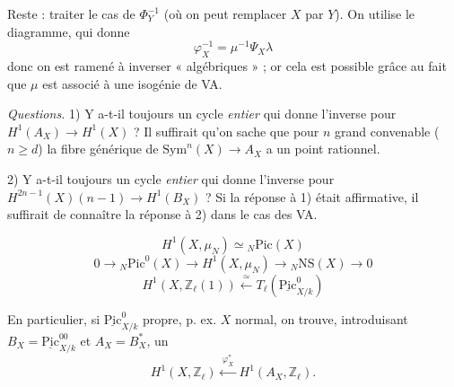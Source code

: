 \documentclass[11pt,a4paper]{article}
\begin{document}
Reste : traiter le cas de $\Phi_{Y}^{-1}$ (où on peut remplacer $X$ par $Y$). On utilise le
 diagramme, qui donne
\[
  \varphi_{X}^{-1} = \mu^{-1}\Psi_{X}\lambda
\]
donc on est ramené à inverser  « algébriques » ; or cela est possible grâce au fait
que $\mu$ est associé à une isogénie de VA.

\emph{Questions.} 1) Y a-t-il toujours un cycle \emph{entier} qui donne l'inverse pour
$H^{1}(A_{X}) \to H^{1}(X)$ ? Il suffirait qu'on sache que pour $n$ grand convenable
( $n \geqslant d$) la fibre générique de $\mathrm{Sym}^{n}(X) \to A_{X}$ a un point
rationnel.

2) Y a-t-il toujours un cycle \emph{entier} qui donne l'inverse pour
$H^{2n-1}(X)(n-1) \to H^{1}(B_{X})$ ? Si la réponse à 1) était affirmative, il suffirait de
connaître la réponse à 2) dans le cas des VA.

\[
  H^{1}(X, \mu_{N}) \simeq {}_{N}\mathrm{Pic}(X)
\]
\[
  0 \to {}_{N}\mathrm{Pic}^{0}(X) \to H^{1}(X, \mu_{N}) \longrightarrow {}_{N}\mathrm{NS}(X) \longrightarrow 0
\]
\[
  H^{1}(X, \mathbb{Z}_{\ell}(1)) \xleftarrow{\ \simeq\ }
  T_{\ell}(\underline{\mathrm{Pic}}^{0}_{X/k})
\]

En particulier, si $\underline{\mathrm{Pic}}^{0}_{X/k}$ propre, p. ex. $X$ normal, on trouve,
introduisant $B_{X} = \underline{\mathrm{Pic}}^{00}_{X/k}$ et $A_{X} = B_{X}^{*}$, un
\[
  H^{1}(X, \mathbb{Z}_{\ell}) \xleftarrow{\ \varphi_{X}^{*}\ } H^{1}(A_{X}, \mathbb{Z}_{\ell}) .
\]
\end{document}
